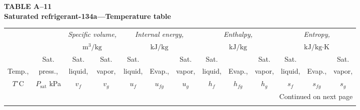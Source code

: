 \documentclass[12pt,a3paper]{article}
\begin{document}
\begin{enumerate}
\noindent\textbf{\Large TABLE A--11} \\
\noindent\textbf{\large Saturated refrigerant-134a---Temperature table}
\vspace{0.3cm}

\begin{center}
\small
\begin{longtable}{c c c c c c c c c c c c c}
\toprule\toprule
& & \multicolumn{2}{c}{\textit{Specific volume,}} & \multicolumn{3}{c}{\textit{Internal energy,}} & \multicolumn{3}{c}{\textit{Enthalpy,}} & \multicolumn{3}{c}{\textit{Entropy,}} \\
& & \multicolumn{2}{c}{$\text{m}^3\text{/kg}$} & \multicolumn{3}{c}{$\text{kJ/kg}$} & \multicolumn{3}{c}{$\text{kJ/kg}$} & \multicolumn{3}{c}{$\text{kJ/kg}\cdot\text{K}$} \\
\cmidrule(lr){3-4} \cmidrule(lr){5-7} \cmidrule(lr){8-10} \cmidrule(lr){11-13}
& Sat. & Sat. & Sat. & Sat. & & Sat. & Sat. & & Sat. & Sat. & & Sat. \\
Temp., & press., & liquid, & vapor, & liquid, & Evap., & vapor, & liquid, & Evap., & vapor, & liquid, & Evap., & vapor, \\
$T^\circ\text{C}$ & $P_{\text{sat}}$ kPa & $v_f$ & $v_g$ & $u_f$ & $u_{fg}$ & $u_g$ & $h_f$ & $h_{fg}$ & $h_g$ & $s_f$ & $s_{fg}$ & $s_g$ \\
\midrule
\endhead

\midrule
\multicolumn{13}{r}{{Continued on next page}} \\
\bottomrule
\endfoot

\bottomrule\bottomrule
\endlastfoot


\end{longtable}
\end{center}
\end{enumerate}
\end{document}
